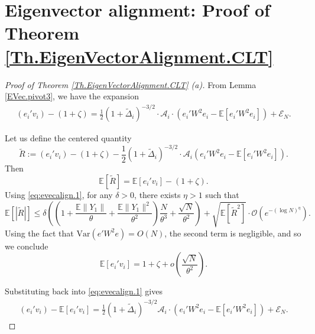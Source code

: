 \documentclass[11pt, reqno]{amsart}
\numberwithin{equation}{section}
\begin{document}
\section{Eigenvector alignment: Proof of Theorem \ref{Th.EigenVectorAlignment.CLT}}\label{section:alignment}
\begin{proof}[Proof of Theorem \ref{Th.EigenVectorAlignment.CLT} (a)]
From Lemma \ref{EVec.pivot3}, we have the expansion
 \begin{align}
 (e_i' v_i)-(1+\zeta)=\frac{1}{2} (1 + \tilde\Delta_i)^{-3/2} \cdot \mathcal A_i\cdot \left( e_i' W^2 e_i - \mathbb{E}[e_i' W^2 e_i] \right) + \mathcal{E}_N.\label{eq:evecalign.1}
 \end{align}


Let us define the centered quantity
\[
\widetilde{R} := (e_i' v_i) - (1 + \zeta) - \frac{1}{2} (1 + \tilde\Delta_i)^{-3/2} \cdot\mathcal{A}_i \left( e_i' W^2 e_i - \mathbb{E}[e_i' W^2 e_i] \right).
\]
Then
\[
\mathbb{E}[\widetilde{R}] = \mathbb{E}[e_i' v_i] - (1 + \zeta).
\]
Using \eqref{eq:evecalign.1}, for any $\delta > 0$, there exists $\eta > 1$ such that
\[
\mathbb{E}[|\widetilde{R}|] \le \delta \left( \left(1 + \frac{\mathbb{E}\|Y_1\|}{\theta} + \frac{\mathbb{E}\|Y_1\|^2}{\theta^2} \right) \frac{N}{\theta^3} + \frac{\sqrt{N}}{\theta^2} \right) + \sqrt{\mathbb{E}[\widetilde{R}^2]} \cdot \mathcal{O}(e^{-(\log N)^\eta}).
\]
Using the fact that $\mathrm{Var}(e'W^2e)= O(N)$, the second term is negligible, and so we conclude
\begin{equation}
\mathbb{E}[e_i' v_i] = 1 + \zeta + o\left( \frac{\sqrt{N}}{\theta^2} \right).
\end{equation}

Substituting back into \eqref{eq:evecalign.1} gives
\begin{align}
(e_i' v_i) - \mathbb{E}[e_i' v_i]
= \frac{1}{2} (1 + \tilde\Delta_i)^{-3/2}\mathcal{A}_i \cdot \left( e_i' W^2 e_i - \mathbb{E}[e_i' W^2 e_i] \right) + \mathcal{E}_N. \label{eq:evecalign.2}
\end{align}



\end{proof}
\end{document}
